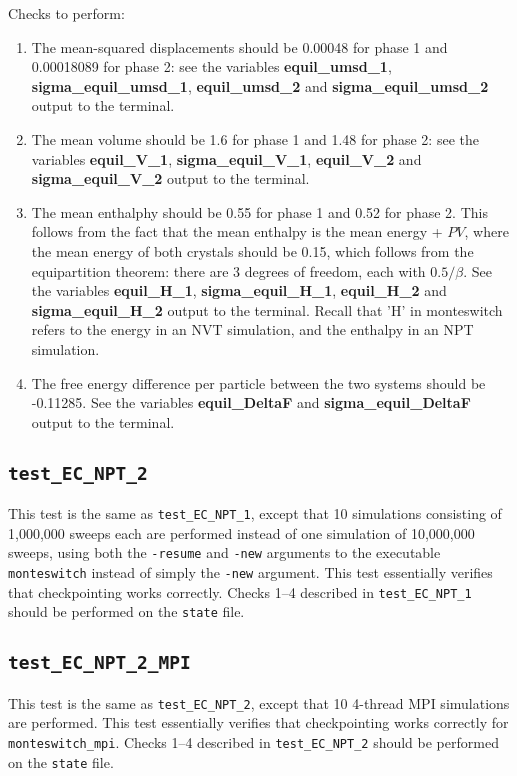 \documentclass{report}
\begin{document}
Checks to perform:
\begin{enumerate}
\item
The mean-squared displacements should be 0.00048 for phase 1 and 0.00018089 for phase 2: see the 
variables \textbf{equil\_umsd\_1}, \textbf{sigma\_equil\_umsd\_1}, \textbf{equil\_umsd\_2} and \textbf{sigma\_equil\_umsd\_2} output to the 
terminal.
\item
The mean volume should be 1.6 for phase 1 and 1.48 for phase 2: see the variables \textbf{equil\_V\_1}, 
\textbf{sigma\_equil\_V\_1}, \textbf{equil\_V\_2} and \textbf{sigma\_equil\_V\_2} output to the terminal.
\item
The mean enthalphy should be 0.55 for phase 1 and 0.52 for phase 2. This follows from the fact that
the mean enthalpy is the mean energy + $PV$, where the mean energy of both crystals should be 0.15, which 
follows from the equipartition theorem: there are 3 degrees of freedom, each with $0.5/\beta$.
See the variables \textbf{equil\_H\_1}, \textbf{sigma\_equil\_H\_1}, \textbf{equil\_H\_2} and \textbf{sigma\_equil\_H\_2} output to the terminal.
Recall that 'H' in monteswitch refers to the energy in an NVT simulation, and the enthalpy in an NPT simulation.
\item
The free energy difference per particle between the two systems should be -0.11285. See the variables
\textbf{equil\_DeltaF} and \textbf{sigma\_equil\_DeltaF} output to the terminal.
\end{enumerate}


\subsection{\texttt{test\_EC\_NPT\_2}}
This test is the same as \texttt{test\_EC\_NPT\_1}, except that 10 simulations consisting of 1,000,000 sweeps each are performed
instead of one simulation of 10,000,000 sweeps, using both the \texttt{-resume} and \texttt{-new} arguments to the executable 
\texttt{monteswitch} instead of simply the \texttt{-new} argument. This test essentially verifies that checkpointing works
correctly. Checks 1--4 described in \texttt{test\_EC\_NPT\_1} should be performed on the \texttt{state} file.


\subsection{\texttt{test\_EC\_NPT\_2\_MPI}}
This test is the same as \texttt{test\_EC\_NPT\_2}, except that 10 4-thread MPI simulations are performed. This test essentially verifies 
that checkpointing works correctly for \texttt{monteswitch\_mpi}. Checks 1--4 described in \texttt{test\_EC\_NPT\_2} should be 
performed on the \texttt{state} file.
\end{document}
